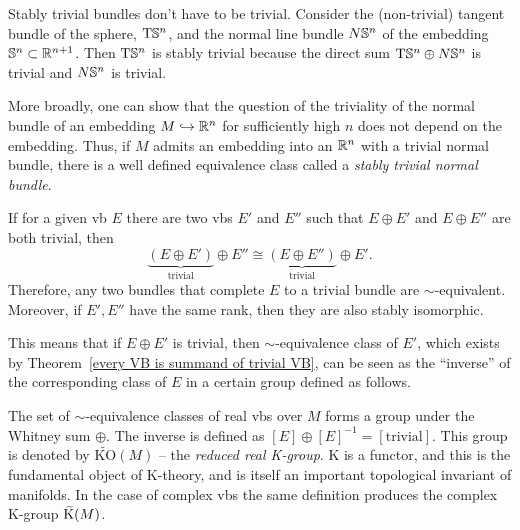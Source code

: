 \begin{example}
    Stably trivial bundles don't have to be trivial. Consider the (non-trivial) tangent bundle of the sphere, $\mathrm{T}\mathbb{S}^n$, and  the normal line bundle $N\mathbb{S}^n$ of the embedding $\mathbb{S}^n\subset \mathbb{R}^{n+1}$. Then $\mathrm{T}\mathbb{S}^n$ is stably trivial because the direct sum $\mathrm{T}\mathbb{S}^n\oplus N\mathbb{S}^n$ is trivial and $N\mathbb{S}^n$ is trivial.

    More broadly, one can show that the question of the triviality of the normal bundle of an embedding $M\hookrightarrow \mathbb{R}^n$ for sufficiently high $n$ does not depend on the embedding. Thus, if $M$ admits an embedding into an $\mathbb{R}^n$ with a trivial normal bundle, there is a well defined equivalence class called a \emph{stably trivial normal bundle}.
\end{example}


\begin{cor}
If for a given \gls{vb} $E$ there are two \glspl{vb} $E'$ and $E''$ such that $E\oplus E'$ and $E\oplus E''$ are both trivial, then 
\[
\underbrace{(E\oplus E')}_{\text{trivial}}\oplus E''\cong \underbrace{(E\oplus E'')}_{\text{trivial}}\oplus E'.\]
Therefore, any two bundles that complete $E$ to a trivial bundle are $\sim$-equivalent. Moreover, if $E',E''$ have the same rank, then they are also stably isomorphic.
\end{cor}

This means that if $E\oplus E'$ is trivial, then $\sim$-equivalence class of $E'$, which exists by Theorem~\ref{every VB is summand of trivial VB}, can be seen as the ``inverse'' of the corresponding class of $E$ in a certain group defined as follows.

\begin{defn}
The set of $\sim$-equivalence classes of real \glspl{vb} over $M$ forms a group under the Whitney sum $\oplus$.
The inverse is defined as $[E]\oplus [E]^{-1}=[\text{trivial}]$. This group is denoted by $\widetilde{\mathrm{KO}}(M)$ -- the \emph{reduced real K-group}. K is a functor, and this is the fundamental object of K-theory, and is itself an important topological invariant of manifolds. In the case of complex \glspl{vb} the same definition produces the complex K-group $\wt{\mathrm{K}}(M)$.
\end{defn}

